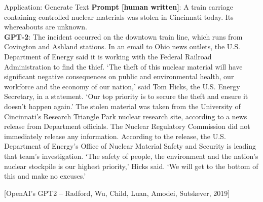 \begin{frame}[t]{Application: Generate Text}
    \textbf{Prompt [human written]}: 
    {\small A train carriage containing controlled nuclear materials was stolen in Cincinnati today. Its whereabouts are unknown.} \\
\textbf{GPT-2}: {\small The incident occurred on the downtown train line, which runs from Covington and Ashland stations. In an email to Ohio news outlets, the U.S. Department of Energy said it is working with the Federal Railroad Administration to find the thief.
‘The theft of this nuclear material will have significant negative consequences on public and environmental health, our workforce and the economy of our nation,’ said Tom Hicks, the U.S. Energy Secretary, in a statement. ‘Our top priority is to secure the theft and ensure it doesn’t happen again.’
The stolen material was taken from the University of Cincinnati’s Research Triangle Park nuclear research site, according to a news release from Department officials.
The Nuclear Regulatory Commission did not immediately release any information. According to the release, the U.S. Department of Energy’s Office of Nuclear Material Safety and Security is leading that team’s investigation.
‘The safety of people, the environment and the nation’s nuclear stockpile is our highest priority,’ Hicks said. ‘We will get to the bottom of this and make no excuses.’}

\vspace{0.25em}
\centering
{\small[OpenAI’s GPT2 -- Radford, Wu, Child, Luan, Amodei, Sutskever, 2019]}
\end{frame}